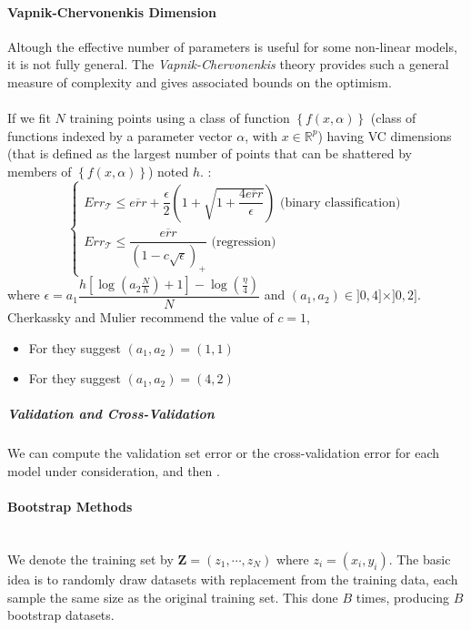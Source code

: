 \paragraph{Vapnik-Chervonenkis Dimension}
Altough the effective number of parameters is useful for some non-linear models, it is not fully
general. The \emph{Vapnik-Chervonenkis} theory provides such a general measure of complexity and
gives associated bounds on the optimism.\\
\\
If we fit $N$ training points using a class of function $\left\{f(x,\alpha)\right\}$ (class of 
functions indexed by a parameter vector $\alpha$, with $x\in\mathbb{R}^{p}$) having VC dimensions
(that is defined as the largest number of points that can be shattered by members of $\left\{
f(x,\alpha)\right\}$) noted $h$. :
$$
\begin{cases}
	Err_{\mathcal{T}} \leq \overline{err}+\dfrac{\epsilon}{2}\left(1+\sqrt{1+\dfrac{4\overline{
	err}}{\epsilon}}\right)\text{ (binary classification)}\\
	Err_{\mathcal{T}} \leq \dfrac{\overline{err}}{\left(1-c\sqrt{\epsilon}\right)_{+}} \text{ (regression)}
\end{cases}
$$
where $\epsilon=a_{1}\dfrac{h\left[\log\left(a_{2}\frac{N}{h}\right)+1\right]-\log\left(\frac{\eta}{4}\right)}{N}$ and $(a_{1},a_{2})\in]0,4]\times]0,2]$.\\
Cherkassky and Mulier recommend the value of $c=1$,
\begin{itemize}
	\item For  they suggest $(a_{1},a_{2})=(1,1)$
	\item For  they suggest $(a_{1},a_{2})=(4,2)$
\end{itemize}

\subparagraph{Validation and Cross-Validation}
We can compute the validation set error or the cross-validation error 
for each model under consideration, and then .

\paragraph{Bootstrap Methods}
\\
We denote the training set by $\bm{Z}=(z_{1},\cdots,z_{N})$ where $z_{i}=(x_{i},y_{i})$. The basic
idea is to randomly draw datasets with replacement from the training data, each sample the same size
as the original training set. This done $B$ times, producing $B$ bootstrap datasets.

